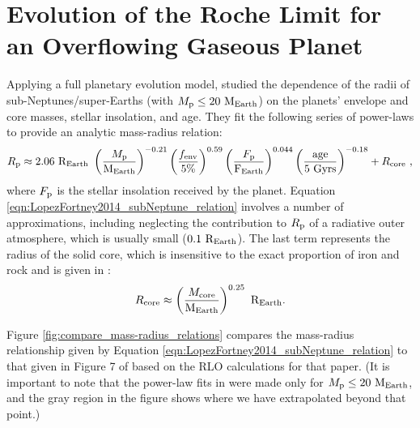 \documentclass{svjour3}                     %
\begin{document}
\section{Evolution of the Roche Limit for an Overflowing Gaseous Planet}
\label{sec:Evolution_of_the_Roche_Limit_for_a_Disrupting_Gaseous_Planet}
Applying a full planetary evolution model, \cite{Lopez2014Understanding} studied the dependence of the radii of sub-Neptunes/super-Earths (with $M_{\rm p} \le 20\ {\rm M_{Earth}}$) on the planets' envelope and core masses, stellar insolation, and age. They fit the following series of power-laws to provide an analytic mass-radius relation:
\begin{equation}
R_{\rm p} \approx 2.06\ {\rm R_{Earth}}\ \left( \dfrac{M_{\rm p}}{\rm M_{Earth}} \right)^{-0.21} \left( \dfrac{f_{\rm env}}{5\%} \right)^{0.59} \left( \dfrac{F_{\rm p}}{\rm F_{Earth}} \right)^{0.044} \left( \dfrac{\rm age}{\rm 5\ Gyrs} \right)^{-0.18} + R_{\rm core}\  ,
\label{eqn:LopezFortney2014_subNeptune_relation}
\end{equation}
where $F_{\rm p}$ is the stellar insolation received by the planet. Equation \ref{eqn:LopezFortney2014_subNeptune_relation} involves a number of approximations, including neglecting the contribution to $R_{\rm p}$ of a radiative outer atmosphere, which is usually small ($0.1\ {\rm R_{Earth}}$). The last term represents the radius of the solid core, which is insensitive to the exact proportion of iron and rock and is given in \cite{Lopez2014Understanding}:
\begin{equation}
R_{\rm core} \approx \left( \dfrac{M_{\rm core}}{\rm M_{Earth}} \right)^{0.25}\ {\rm R_{Earth}}. 
\label{eqn:LopezFortney2014_rockyplanet_relation}
\end{equation}

Figure \ref{fig:compare_mass-radius_relations} compares the mass-radius relationship given by Equation \ref{eqn:LopezFortney2014_subNeptune_relation} to that given in Figure 7 of \cite{2015ApJ...813..101V} based on the RLO calculations for that paper. (It is important to note that the power-law fits in \cite{Lopez2014Understanding} were made only for $M_{\rm p} \le 20\ {\rm M_{Earth}}$, and the gray region in the figure shows where we have extrapolated beyond that point.) 
\end{document}
